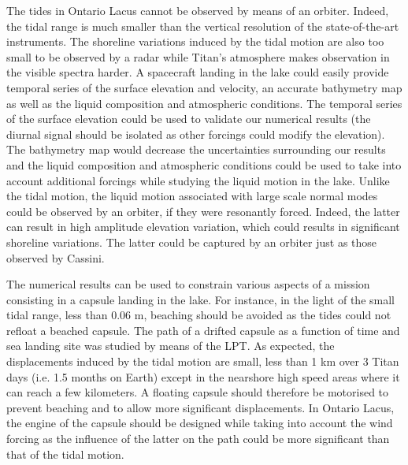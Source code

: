 The tides in Ontario Lacus cannot be observed by means of an orbiter. Indeed, the tidal range is much smaller than the vertical resolution of the state-of-the-art instruments. The shoreline variations induced by the tidal motion are also too small to be observed by a radar while Titan's atmosphere makes observation in the visible spectra harder. A spacecraft landing in the lake could easily provide temporal series of the surface elevation and velocity, an accurate bathymetry map as well as the liquid composition and atmospheric conditions. The temporal series of the surface elevation could be used to validate our numerical results (the diurnal signal should be isolated as other forcings could modify the elevation). The bathymetry map would decrease the uncertainties surrounding our results and the liquid composition and atmospheric conditions could be used to take into account additional forcings while studying the liquid motion in the lake. Unlike the tidal motion, the liquid motion associated with large scale normal modes could be observed by an orbiter, if they were resonantly forced. Indeed, the latter can result in high amplitude elevation variation, which could results in significant shoreline variations. The latter could be captured by an orbiter just as those observed by Cassini.


The numerical results can be used to constrain various aspects of a mission consisting in a capsule landing in the lake. For instance, in the light of the small tidal range, less than 0.06 m, beaching should be avoided as the tides could not refloat a beached capsule. The path of a drifted capsule as a function of time and sea landing site was studied by means of the LPT. As expected, the displacements induced by the tidal motion are small, less than 1 km over 3 Titan days (i.e. 1.5 months on Earth) except in the nearshore high speed areas where it can reach a few kilometers. A floating capsule should therefore be motorised to prevent beaching and to allow more significant displacements. In Ontario Lacus, the engine of the capsule should be designed while taking into account the wind forcing as the influence of the latter on the path could be more significant than that of the tidal motion.

